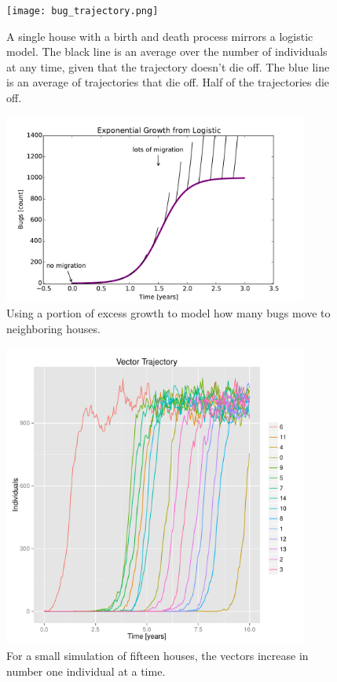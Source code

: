 \documentclass{article}
\begin{document}
\begin{figure}
\centerline{\texttt{[image: bug\_trajectory.png]}}
\caption{A single house with a birth and death process mirrors
a logistic model. The black line is an average over the
number of individuals at any time, given that the trajectory
doesn't die off. The blue line is an average of trajectories
that die off. Half of the trajectories die off.\label{fig:bug_trajectory}}
\end{figure}

\begin{figure}
\centerline{\includegraphics[width=10cm]{excess}}
\caption{Using a portion of excess growth to model
how many bugs move to neighboring houses.\label{fig:excess}}
\end{figure}


\begin{figure}
\centerline{\includegraphics[width=10cm]{housecounts.pdf}}
\caption{For a small simulation of fifteen houses, the vectors increase in number one
individual at a time.\label{fig:housecounts}}
\end{figure}
\end{document}
